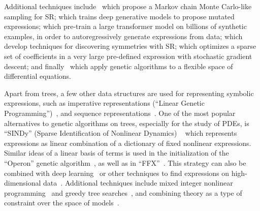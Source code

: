 \documentclass[letterpaper,twocolumn]{scrartcl}
\begin{document}
Additional techniques include~\cite{jinBayesianSymbolicRegression2020,guimeraBayesianMachineScientist2020} which propose a Markov chain Monte Carlo-like sampling for SR;
\cite{petersenDeepSymbolicRegression2021,liNeuralguidedSymbolicRegression2019} which trains deep generative models to propose mutated expressions;
\cite{dascoliDeepSymbolicRegression2022,kamiennyEndtoendSymbolicRegression2022} which pre-train a large transformer model on billions of synthetic examples, in order to autoregressively generate expressions from data;
\cite{udrescuAIFeynmanParetooptimal2020,liuAIPoincareMachine2020,wetzelDiscoveringSymmetryInvariants2020} which develop techniques for discovering symmetries with SR;
\cite{sahooLearningEquationsExtrapolation2018} which optimizes a sparse set of coefficients in a very large pre-defined expression with stochastic gradient descent; and finally~\cite{atkinsonDatadrivenDiscoveryFreeform2019,rossBenchmarkingMachineLearning2022} which apply genetic algorithms to a flexible space of differential equations.

Apart from trees, a few other data structures are used for representing symbolic expressions, such as imperative representations (``Linear Genetic Programming'')~\citep[e.g.,][]{brameierComparisonLinearGenetic2001,guvenLinearGeneticProgramming2009,maEvolvingSymbolicDensity2022,diasDescribingQuantumInspiredLinear2012}, and sequence representations~\citep[e.g.,][]{liuAIPoincareMachine2020,dascoliDeepSymbolicRegression2022,kamiennyEndtoendSymbolicRegression2022}.
One of the most popular alternatives to genetic algorithms on trees, especially for the study of PDEs, is ``SINDy'' (Sparse Identification of Nonlinear Dynamics) ~\cite{bruntonDiscoveringGoverningEquations2016,rudyDatadrivenDiscoveryPartial2017,championDatadrivenDiscoveryCoordinates2019} which represents expressions as linear combination of a dictionary of fixed nonlinear expressions.
Similar ideas of a linear basis of terms is used in the initialization of the ``Operon'' genetic algorithm~\cite{burlacuOperonEfficientGenetic2020}, as well as in ``FFX''~\cite{mcconaghyFFXFastScalable2011}.
This strategy can also be combined with deep learning~\citep[e.g., ][]{luschDeepLearningUniversal2018,championDatadrivenDiscoveryCoordinates2019,bothDeepMoDDeepLearning2019,chenDeepLearningPhysical2020,rackauckasUniversalDifferentialEquations2020} or other techniques to find expressions on high-dimensional data~\citep[e.g., ][]{rossBenchmarkingMachineLearning2022}.
Additional techniques include mixed integer nonlinear programming~\citep{cozadGlobalMINLPApproach2018} and greedy tree searches~\citep{defrancaGreedySearchTree2018}, and combining theory as a type of constraint over the space of models~\cite{cornelioAIDescartesCombining2021}.
\end{document}
